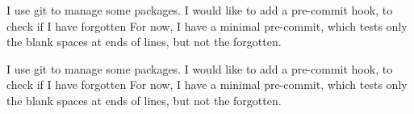 \documentclass[twoside,12pt]{book}
\begin{document}
\pstart
{}
\pend

\pstart
{}
\pend

\pstart
{}
\pend

\pstart
I use git to manage some packages.
I would like to add a pre-commit hook, to check if I have forgotten
For now, I have a minimal pre-commit, which tests only the blank spaces at ends of lines, but not the forgotten.
\pend

\pstart
{}
\pend

\pstart
I use git to manage some packages.
I would like to add a pre-commit hook, to check if I have forgotten
For now, I have a minimal pre-commit, which tests only the blank spaces at ends of lines, but not the forgotten.
\pend

\endnumbering
\end{document}
